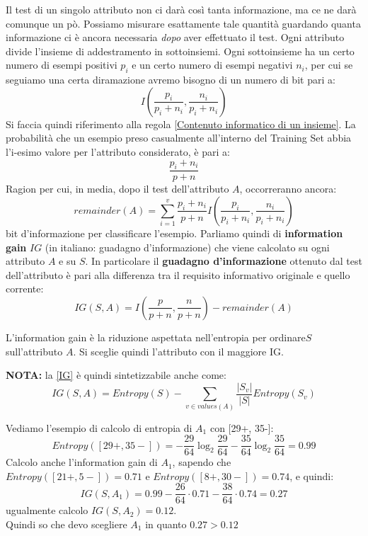 Il test di un singolo attributo non ci darà così tanta informazione, ma ce ne darà comunque un pò. Possiamo misurare esattamente tale quantità guardando quanta informazione ci è ancora necessaria \textit{dopo} aver effettuato il test. Ogni attributo divide l'insieme di addestramento in sottoinsiemi. Ogni sottoinsieme ha un certo numero di esempi positivi $p_i$ e un certo numero di esempi negativi $n_i$, per cui se seguiamo una certa diramazione avremo bisogno di un numero di bit pari a:
\[I\left(\frac{p_i}{p_i+n_i},\frac{n_i}{p_i+n_i}\right)\]
Si faccia quindi riferimento alla regola \ref{Contenuto informatico di un insieme}.
La probabilità che un esempio preso casualmente all'interno del Training Set abbia l'i-esimo valore per l'attributo considerato, è pari a:
\[\frac{p_i+n_i}{p+n}\]
Ragion per cui, in media, dopo il test dell'attributo $A$, occorreranno ancora:
\begin{equation}
\label{IG Attributo}
remainder(A)=\sum_{i=1}^v \frac{p_i+n_i}{p+n}
  I\left(\frac{p_i}{p_i+n_i},\frac{n_i}{p_i+n_i}\right)
    \end{equation}
bit d'informazione per classificare l'esempio.
Parliamo quindi di \textbf{information gain} $IG$ (in italiano: guadagno d'informazione) che viene calcolato su ogni
attributo $A$ e su $S$. In particolare il \textbf{guadagno d'informazione} ottenuto dal test dell'attributo è pari alla differenza tra il requisito informativo originale e quello corrente:
\begin{equation}
\label{IG}
IG(S, A)=I\left(\frac{p}{p+n},\frac{n}{p+n}\right)-remainder(A)
\end{equation}
\begin{definizione}
L'information gain è la riduzione aspettata nell'entropia per ordinare$S$ sull'attributo $A$. Si sceglie quindi l'attributo con il maggiore IG. 
\end{definizione} 
\textbf{NOTA:} la \ref{IG} è quindi sintetizzabile anche come:
\begin{equation}
\label{IG2}
IG(S, A)=Entropy(S)-\sum_{v\in values(A)}\frac{|S_v|}{|S|}Entropy(S_v)
    \end{equation}
\begin{esempio}
  Vediamo l'esempio di calcolo di entropia di $A_1$ con [29+, 35-]:
  \[Entropy([29+, 35-])=
    -\frac{29}{64}\log_2\frac{29}{64}-\frac{35}{64}\log_2\frac{35}{64}=0.99\]
  Calcolo anche l'information gain di $A_1$, sapendo che
  $Entropy([21+, 5-])=0.71$ e $Entropy([8+, 30-])=0.74$,
  e quindi:
  \[IG(S, A_1)=0.99-\frac{26}{64}\cdot 0.71-\frac{38}{64}\cdot 0.74=0.27\]
  ugualmente calcolo $IG(S, A_2)=0.12$. \\
  Quindi so che devo scegliere $A_1$ in quanto $0.27 > 0.12$
\end{esempio}
